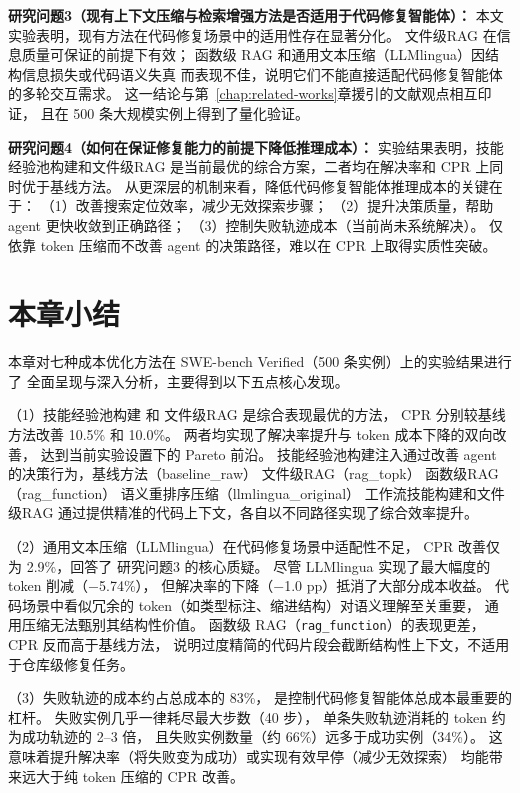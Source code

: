 \textbf{研究问题3（现有上下文压缩与检索增强方法是否适用于代码修复智能体）：}
本文实验表明，现有方法在代码修复场景中的适用性存在显著分化。
文件级RAG 在信息质量可保证的前提下有效；
函数级 RAG 和通用文本压缩（LLMlingua）因结构信息损失或代码语义失真
而表现不佳，说明它们不能直接适配代码修复智能体的多轮交互需求。
这一结论与第~\ref{chap:related-works}章援引的文献观点相互印证，
且在 500 条大规模实例上得到了量化验证。

\textbf{研究问题4（如何在保证修复能力的前提下降低推理成本）：}
实验结果表明，技能经验池构建和文件级RAG
是当前最优的综合方案，二者均在解决率和 CPR 上同时优于基线方法。
从更深层的机制来看，降低代码修复智能体推理成本的关键在于：
（1）改善搜索定位效率，减少无效探索步骤；
（2）提升决策质量，帮助 agent 更快收敛到正确路径；
（3）控制失败轨迹成本（当前尚未系统解决）。
仅依靠 token 压缩而不改善 agent 的决策路径，难以在 CPR 上取得实质性突破。


\section{本章小结}
\label{sec:chap6-summary}

本章对七种成本优化方法在 SWE-bench Verified（500 条实例）上的实验结果进行了
全面呈现与深入分析，主要得到以下五点核心发现。

（1）技能经验池构建 和 文件级RAG 是综合表现最优的方法，
CPR 分别较基线方法改善 10.5\% 和 10.0\%。
两者均实现了解决率提升与 token 成本下降的双向改善，
达到当前实验设置下的 Pareto 前沿。
技能经验池构建注入通过改善 agent 的决策行为，基线方法（baseline\_raw） 文件级RAG（rag\_topk） 函数级RAG（rag\_function） 语义重排序压缩（llmlingua\_original） 工作流技能构建和文件级RAG
通过提供精准的代码上下文，各自以不同路径实现了综合效率提升。

（2）通用文本压缩（LLMlingua）在代码修复场景中适配性不足，
CPR 改善仅为 2.9\%，回答了 研究问题3 的核心质疑。
尽管 LLMlingua 实现了最大幅度的 token 削减（$-$5.74\%），
但解决率的下降（$-$1.0 pp）抵消了大部分成本收益。
代码场景中看似冗余的 token（如类型标注、缩进结构）对语义理解至关重要，
通用压缩无法甄别其结构性价值。
函数级 RAG（\texttt{rag\_function}）的表现更差，CPR 反而高于基线方法，
说明过度精简的代码片段会截断结构性上下文，不适用于仓库级修复任务。

（3）失败轨迹的成本约占总成本的 83\%，
是控制代码修复智能体总成本最重要的杠杆。
失败实例几乎一律耗尽最大步数（40 步），
单条失败轨迹消耗的 token 约为成功轨迹的 2–3 倍，
且失败实例数量（约 66\%）远多于成功实例（34\%）。
这意味着提升解决率（将失败变为成功）或实现有效早停（减少无效探索）
均能带来远大于纯 token 压缩的 CPR 改善。

